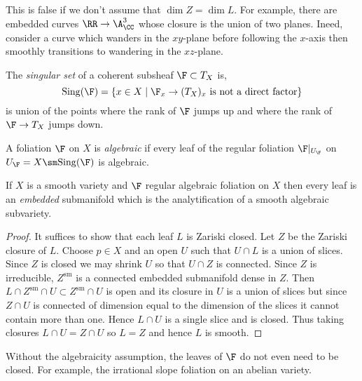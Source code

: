 \documentclass[12pt]{article}
\begin{document}
\begin{rmk}
This is false if we don't assume that $\dim{Z} = \dim{L}$. For example, there are embedded curves $\RR \to \A^3_{\CC}$ whose closure is the union of two planes. Ineed, consider a curve which wanders in the $xy$-plane before following the $x$-axis then smoothly transitions to wandering in the $xz$-plane. 
\end{rmk}

\renewcommand{\Sing}{\mathrm{Sing}}

\begin{defn}
The \textit{singular set} of a coherent subsheaf $\F \subset T_X$ is,
\[ \Sing(\F) = \{ x \in X \mid \F_x \to (T_X)_x \text{ is not a direct factor} \} \]
is union of the points where the rank of $\F$ jumps up and where the rank of $\F \to T_X$ jumps down.
\end{defn}

\begin{defn}
A foliation $\F$ on $X$ is \textit{algebraic} if every leaf of the regular foliation $\F|_{U_{\F}}$ on $U_{\F} = X \sm \Sing(\F)$ is algebraic.
\end{defn}

\begin{prop}
If $X$ is a smooth variety and $\F$ regular algebraic foliation on $X$ then every leaf is an \textit{embedded} submanifold which is the analytification of a smooth algebraic subvariety.
\end{prop}

\begin{proof}
It suffices to show that each leaf $L$ is Zariski closed. Let $Z$ be the Zariski closure of $L$. Choose $p \in X$ and an open $U$ such that $U \cap L$ is a union of slices. Since $Z$ is closed we may shrink $U$ so that $U \cap Z$ is connected. Since $Z$ is irreducible, $Z^{\text{sm}}$ is a connected embedded submanifold dense in $Z$. Then $L \cap Z^{\text{sm}} \cap U \subset Z^{\text{sm}} \cap U$ is open and its closure in $U$ is a union of slices but since $Z \cap U$ is connected of dimension equal to the dimension of the slices it cannot contain more than one. Hence $L \cap U$ is a single slice and is closed. Thus taking closures $L \cap U = Z \cap U$ so $L = Z$ and hence $L$ is smooth.
\end{proof}

\begin{rmk}
Without the algebraicity assumption, the leaves of $\F$ do not even need to be closed. For example, the irrational slope foliation on an abelian variety. 
\end{rmk}
\end{document}
